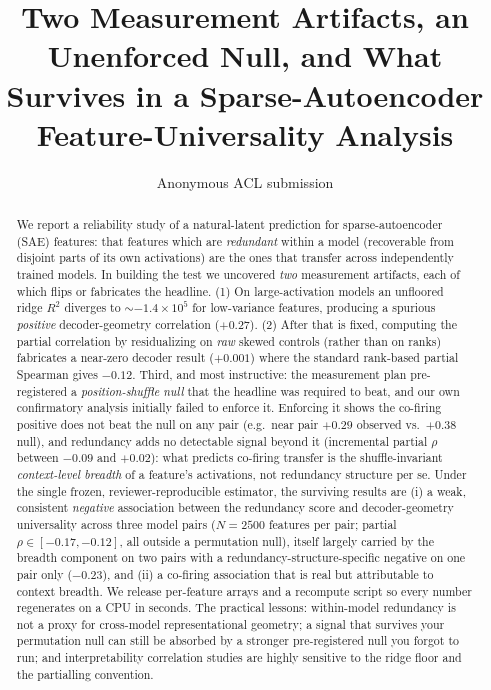 \documentclass[11pt]{article}
\title{Two Measurement Artifacts, an Unenforced Null, and What Survives in a Sparse-Autoencoder Feature-Universality Analysis}
\author{Anonymous ACL submission}
\begin{document}
\maketitle

\begin{abstract}
We report a reliability study of a natural-latent prediction for sparse-autoencoder (SAE) features: that
features which are \emph{redundant} within a model (recoverable from disjoint parts of its own
activations) are the ones that transfer across independently trained models. In building the test we
uncovered \emph{two} measurement artifacts, each of which flips or fabricates the headline. (1) On
large-activation models an unfloored ridge $R^2$ diverges to $\sim{-}1.4\times10^{5}$ for low-variance
features, producing a spurious \emph{positive} decoder-geometry correlation ($+0.27$). (2) After that is
fixed, computing the partial correlation by residualizing on \emph{raw} skewed controls (rather than on
ranks) fabricates a near-zero decoder result ($+0.001$) where the standard rank-based partial Spearman
gives $-0.12$. Third, and most instructive: the measurement plan pre-registered a \emph{position-shuffle
null} that the headline was required to beat, and our own confirmatory analysis initially failed to
enforce it. Enforcing it shows the co-firing positive does not beat the null on any pair (e.g.\ near pair
$+0.29$ observed vs.\ $+0.38$ null), and redundancy adds no detectable signal beyond it (incremental
partial $\rho$ between $-0.09$ and $+0.02$): what predicts co-firing transfer is the shuffle-invariant
\emph{context-level breadth} of a feature's activations, not redundancy structure per se. Under the single
frozen, reviewer-reproducible estimator, the surviving results are (i) a weak, consistent
\emph{negative} association between the redundancy score and decoder-geometry universality across three
model pairs ($N{=}2500$ features per pair; partial $\rho\in[-0.17,-0.12]$, all outside a permutation
null), itself largely carried by the breadth component on two pairs with a redundancy-structure-specific
negative on one pair only ($-0.23$), and (ii) a co-firing association that is real but attributable to
context breadth. We release per-feature arrays and a recompute script so every number
regenerates on a CPU in seconds. The practical lessons: within-model redundancy is not a proxy for
cross-model representational geometry; a signal that survives your permutation null can still be absorbed
by a stronger pre-registered null you forgot to run; and interpretability correlation studies are
highly sensitive to the ridge floor and the partialling convention.
\end{abstract}
\end{document}

